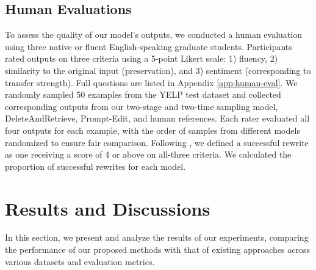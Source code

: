 \documentclass{article}
\begin{document}
\subsection{Human Evaluations}
To assess the quality of our model's outputs, we conducted a human evaluation using three native or fluent English-speaking graduate students. Participants rated outputs on three criteria using a 5-point Likert scale: 1) fluency, 2) similarity to the original input (preservation), and 3) sentiment (corresponding to transfer strength). Full questions are listed in Appendix \ref{app:human-eval}. We randomly sampled 50 examples from the YELP test dataset and collected corresponding outputs from our two-stage and two-time sampling model, DeleteAndRetrieve, Prompt-Edit, and human references. Each rater evaluated all four outputs for each example, with the order of samples from different models randomized to ensure fair comparison. Following \cite{li2018delete}, we defined a successful rewrite as one receiving a score of 4 or above on all-three criteria. We calculated the proportion of successful rewrites for each model.

\section{Results and Discussions}
In this section, we present and analyze the results of our experiments, comparing the performance of our proposed methods with that of existing approaches across various datasets and evaluation metrics.
\end{document}
